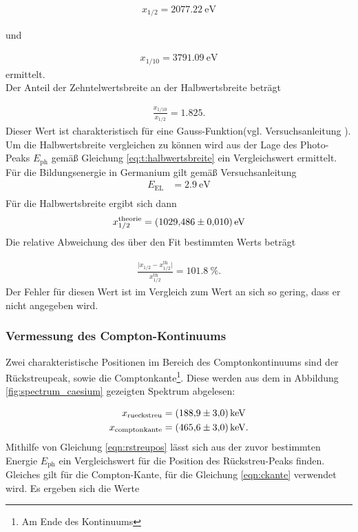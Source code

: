 \begin{align*}
  x_{1/2} = \SI{2077.22}{\electronvolt}
\end{align*}

und

\begin{align*}
  x_{1/10} = \SI{3791.09}{\electronvolt}
\end{align*}
ermittelt.\\
Der Anteil der Zehntelwertsbreite an der Halbwertsbreite beträgt

\begin{align*}
  \frac{x_{1/10}}{x_{1/2}} = \SI{1.825}.
\end{align*}
Dieser Wert ist charakteristisch für eine Gauss-Funktion(vgl. Versuchsanleitung \cite{sample}).\\
Um die Halbwertsbreite vergleichen zu können wird aus der Lage des Photo-Peaks $E_{\text{ph}}$  gemäß Gleichung \eqref{eq:t:halbwertsbreite} ein Vergleichswert ermittelt.\\
Für die Bildungsenergie in Germanium gilt gemäß Versuchsanleitung\cite{sample}
\begin{align*}
  E_\text{EL} &= \SI{2.9}{\electronvolt}\\
\end{align*}
Für die Halbwertsbreite ergibt sich dann
\begin{align}
  x_{1/2}^{\text{theorie}} = \SI{1029.486+-0.010}{\electronvolt}
\end{align}
Die relative Abweichung des über den Fit bestimmten Werts beträgt

\begin{align}
  \frac{\lvert x_{1/2} - x_{1/2}^{\text{th}} \rvert}{x_{1/2}^{\text{th}}} = \SI{101.8}{\percent}.
\end{align}
Der Fehler für diesen Wert ist im Vergleich zum Wert an sich so gering, dass er nicht angegeben wird.

\FloatBarrier
\subsubsection{Vermessung des Compton-Kontinuums}
\label{subsubsec:a22}
Zwei charakteristische Positionen im Bereich des Comptonkontinuums sind der Rückstreupeak, sowie die
Comptonkante\footnote{Am Ende des Kontinuums}. Diese werden aus dem in Abbildung \ref{fig:spectrum_caesium} gezeigten
Spektrum abgelesen:

\begin{align*}
  x_\text{rueckstreu} &= \SI{188.9+-3.0}{\kilo\electronvolt}\\
  x_\text{comptonkante} &= \SI{465.6+-3.0}{\kilo\electronvolt}.
\end{align*}
Mithilfe von Gleichung \eqref{eqn:rstreupos} lässt sich aus der zuvor bestimmten Energie $E_\text{ph}$
ein Vergleichswert für die Position des Rückstreu-Peaks finden. Gleiches gilt für die Compton-Kante, für die Gleichung
\eqref{eqn:ckante} verwendet wird.
Es ergeben sich die Werte

